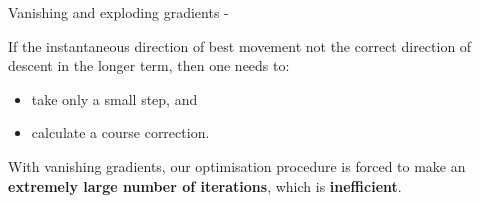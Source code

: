 \begin{frame}[t,allowframebreaks]{
    Vanishing and exploding gradients -}
    \framebreak


    If the instantaneous direction of best movement 
    not the correct direction of 
    descent in the longer term, then one needs to:
    \begin{itemize}
        \item take only a small step, and
        \item calculate a course correction.
    \end{itemize}    

    \vspace{0.2cm}

    With \glspl{vanishing gradient},
    our \gls{optimisation} procedure 
    is forced to make an {\bf extremely large number of iterations},
    which is {\bf inefficient}.

\end{frame}
